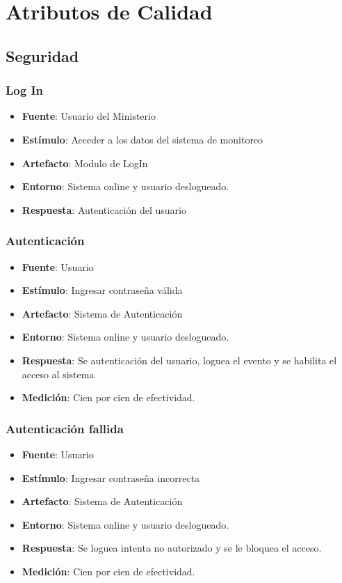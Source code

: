 \section{Atributos de Calidad}

\subsection{Seguridad}

\subsubsection{Log In}
\begin{itemize}
\item {\bf Fuente}: Usuario del Ministerio
\item {\bf Estímulo}: Acceder a los datos del sistema de monitoreo
\item {\bf Artefacto}: Modulo de LogIn
\item {\bf Entorno}: Sistema online y usuario deslogueado. 
\item {\bf Respuesta}: Autenticación del usuario
\end{itemize}

\subsubsection{Autenticación}
\begin{itemize}
\item {\bf Fuente}: Usuario
\item {\bf Estímulo}: Ingresar contraseña válida
\item {\bf Artefacto}: Sistema de Autenticación
\item {\bf Entorno}: Sistema online y usuario deslogueado. 
\item {\bf Respuesta}: Se autenticación del usuario, loguea el evento y se habilita el acceso al sistema
\item {\bf Medición}: Cien por cien de efectividad.
\end{itemize}

\subsubsection{Autenticación fallida}
\begin{itemize}
\item {\bf Fuente}: Usuario
\item {\bf Estímulo}: Ingresar contraseña incorrecta
\item {\bf Artefacto}: Sistema de Autenticación
\item {\bf Entorno}: Sistema online y usuario deslogueado. 
\item {\bf Respuesta}: Se loguea intenta no autorizado y se le bloquea el acceso. 
\item {\bf Medición}: Cien por cien de efectividad.
\end{itemize}

